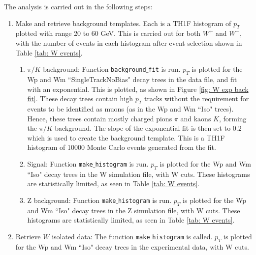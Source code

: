 \documentclass[a4paper]{article}
\begin{document}
The analysis is carried out in the following steps:
\begin{enumerate}
    \item Make and retrieve background templates. Each is a TH1F histogram of $p_T$ plotted with range 20 to 60 GeV. This is carried out for both $W^+$ and $W^-$, with the number of events in each histogram after event selection shown in Table \ref{tab: W events}.
    \begin{enumerate}
        \item $\pi/K$ background: Function \texttt{background$\_$fit} is run. $p_T$ is plotted for the Wp and Wm ``SingleTrackNoBias" decay trees in the data file, and fit with an exponential. This is plotted, as shown in Figure \ref{fig: W exp back fit}. These decay trees contain high $p_T$ tracks without the requirement for events to be identified as muons (as in the Wp and Wm ``Iso" trees). Hence, these trees contain mostly charged pions $\pi$ and kaons $K$, forming the $\pi/K$ background.
        \newline The slope of the exponential fit is then set to 0.2 which is used to create the background template. This is a TH1F histogram of 10000 Monte Carlo events generated from the fit.
        \item Signal: Function \texttt{make$\_$histogram} is run. $p_T$ is plotted for the Wp and Wm ``Iso" decay trees in the W simulation file, with W cuts. These histograms are statistically limited, as seen in Table \ref{tab: W events}.
        \item Z background: Function \texttt{make$\_$histogram} is run. $p_T$ is plotted for the Wp and Wm ``Iso" decay trees in the Z simulation file, with W cuts. These histograms are statistically limited, as seen in Table \ref{tab: W events}.
    \end{enumerate}
    
    \item Retrieve $W$ isolated data: The function \texttt{make$\_$histogram} is called. $p_T$ is plotted for the Wp and Wm ``Iso" decay trees in the experimental data, with W cuts.
    

\end{enumerate}
\end{document}
